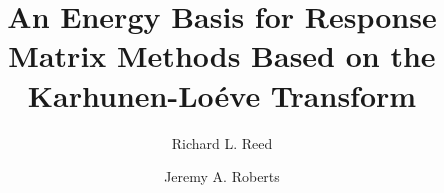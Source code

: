 \documentclass[5p,times,twocolumn,10pt]{elsarticle}
\begin{document}
    
    \begin{frontmatter}
        
        
        
    
    \title{An Energy Basis for Response Matrix Methods Based on the Karhunen-Lo\'{e}ve Transform}
    
    
    \author{Richard L. Reed}
    \author{Jeremy A. Roberts}
    
    
    \address{Department of Mechanical and Nuclear Engineering, Kansas State University}
    

\end{frontmatter}
\end{document}
